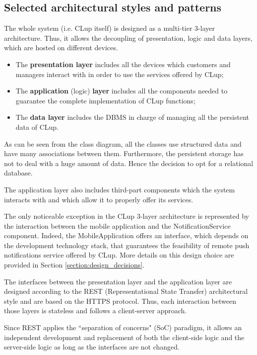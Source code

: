 \documentclass[a4paper,oneside,11pt]{book}
\begin{document}
    \subsection{Selected architectural styles and patterns}
    The whole system (i.e. CLup itself) is designed as a multi-tier 3-layer architecture. Thus, it allows the decoupling of presentation, logic and data layers, which are hosted on different devices.
    \begin{itemize}
        \item The \textbf{presentation layer} includes all the devices which customers and managers interact with in order to use the services offered by CLup;
        \item The \textbf{application} (logic) \textbf{layer} includes all the components needed to guarantee the complete implementation of CLup functions;
        \item The \textbf{data layer} includes the DBMS in charge of managing all the persistent data of CLup.
    \end{itemize}
    As can be seen from the class diagram, all the classes use structured data and have many associations between them. Furthermore, the persistent storage has not to deal with a huge amount of data. Hence the decision to opt for a relational database. \par
    The application layer also includes third-part components which the system interacts with and which allow it to properly offer its services. \par
    The only noticeable exception in the CLup 3-layer architecture is represented by the interaction between the mobile application and the NotificationService component. Indeed, the MobileApplication offers an interface, which depends on the development technology stack, that guarantees the feasibility of remote push notifications service offered by CLup. More details on this design choice are provided in Section  \ref{section:design_decisions}. \par
    The interfaces between the presentation layer and the application layer are designed according to the REST (Representational State Transfer) architectural style and are based on the HTTPS protocol. Thus, each interaction between those layers is stateless and follows a client-server approach. \par
    Since REST applies the ``separation of concerns" (SoC) paradigm, it allows an independent development and replacement of both the client-side logic and the server-side logic as long as the interfaces are not changed. \par
\end{document}
